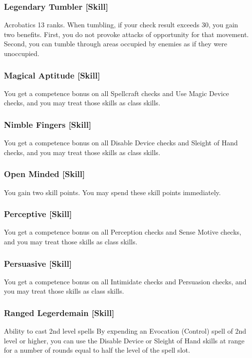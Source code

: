 \subsubsection{Legendary Tumbler [Skill]}
\featpre Acrobatics 13 ranks.
\featben When tumbling, if your check result exceeds 30, you gain two benefits. First, you do not provoke attacks of opportunity for that movement. Second, you can tumble through areas occupied by enemies as if they were unoccupied.

\subsubsection{Magical Aptitude [Skill]}
 You get a  competence bonus on all Spellcraft checks and Use Magic Device checks, and you may treat those skills as class skills.

\subsubsection{Nimble Fingers [Skill]}
 You get a  competence bonus on all Disable Device checks and Sleight of Hand checks, and you may treat those skills as class skills.

\subsubsection{Open Minded [Skill]}
 You gain two skill points. You may spend these skill points immediately.

\subsubsection{Perceptive [Skill]}
 You get a  competence bonus on all Perception checks and Sense Motive checks, and you may treat those skills as class skills.

\subsubsection{Persuasive [Skill]}
 You get a  competence bonus on all Intimidate checks and Persuasion checks, and you may treat those skills as class skills.

\subsubsection{Ranged Legerdemain [Skill]}
 Ability to cast 2nd level spells
 By expending an Evocation (Control) spell of 2nd level or higher, you can use the Disable Device or Sleight of Hand skills at \rngclose range for a number of rounds equal to half the level of the spell slot.

